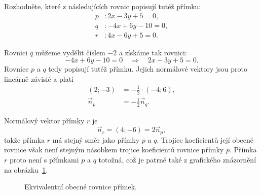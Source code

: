 \begin{example}\label{exa:Equivalent_general_line_equations}
    Rozhodněte, které z následujících rovnic popisují tutéž přímku:
    \begin{align*}
        p &: 2x-3y+5=0,\\
        q &: -4x+6y-10=0,\\
        r &: 4x-6y+5=0.
    \end{align*}

    Rovnici $q$ můžeme vydělit číslem $-2$ a získáme tak rovnici:
    \[
        -4x+6y-10=0
        \quad\Longrightarrow\quad
        2x-3y+5=0.
    \]
    Rovnice $p$ a $q$ tedy popisují tutéž přímku. Jejich normálové
    vektory jsou proto lineárně závislé a platí
    \begin{align*}
        (2;-3) &= -\frac{1}{2}\cdot(-4;6),\\
        \vec{n}_p &= -\frac{1}{2}\vec{n}_q.
    \end{align*}

    Normálový vektor přímky $r$ je
    \[
        \vec{n}_r=(4;-6)=2\vec{n}_p,
    \]
    takže přímka $r$ má stejný směr jako přímky $p$ a $q$. Trojice
    koeficientů její obecné rovnice však není stejným násobkem trojice
    koeficientů rovnice přímky $p$. Přímka $r$ proto není s přímkami
    $p$ a $q$ totožná, což je patrné také z grafického znázornění
    na obrázku~\ref{fig:Equivalent_general_line_equations}.
    \begin{figure}[H]
        \centering
    \caption{Ekvivalentní obecné rovnice přímek.}
    \label{fig:Equivalent_general_line_equations}
    \end{figure}
\end{example}

